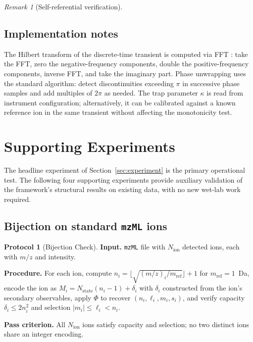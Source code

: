 \documentclass[twocolumn,10pt,a4paper]{article}
\theoremstyle{thmstyle}
\theoremstyle{definition}
\newtheorem{protocol}[theorem]{Protocol}
\theoremstyle{remark}
\newtheorem{remark}[theorem]{Remark}
\newcommand{\PhiMap}{\varPhi}
\begin{document}
\begin{remark}[Self-referential verification]
\subsection{Implementation notes}

The Hilbert transform of the discrete-time transient is computed via
FFT \citep{cooley1965}: take the FFT, zero the negative-frequency
components, double the positive-frequency components, inverse FFT,
and take the imaginary part. Phase unwrapping uses the standard
algorithm: detect discontinuities exceeding $\pi$ in successive phase
samples and add multiples of $2\pi$ as needed. The trap parameter
$\kappa$ is read from instrument configuration; alternatively, it can
be calibrated against a known reference ion in the same transient
without affecting the monotonicity test.

\section{Supporting Experiments}
\label{sec:supporting}

The headline experiment of Section~\ref{sec:experiment} is the
primary operational test. The following four supporting experiments
provide auxiliary validation of the framework's structural results on
existing data, with no new wet-lab work required.

\subsection{Bijection on standard \texttt{mzML} ions}

\begin{protocol}[Bijection Check]
\label{prot:bij}
\textbf{Input.} \texttt{mzML} file with $N_{\mathrm{ion}}$ detected
ions, each with $m/z$ and intensity.

\textbf{Procedure.} For each ion, compute
$n_{i}=\lfloor\sqrt{(m/z)_{i}/m_{\mathrm{ref}}}\rfloor+1$ for
$m_{\mathrm{ref}}=1$~Da, encode the ion as
$M_{i}=N_{\mathrm{state}}(n_{i}-1)+\delta_{i}$ with $\delta_{i}$
constructed from the ion's secondary observables, apply $\PhiMap$ to
recover $(n_{i},\ell_{i},m_{i},s_{i})$, and verify capacity
$\delta_{i}\leq 2n_{i}^{2}$ and selection $|m_{i}|\leq\ell_{i}<n_{i}$.

\textbf{Pass criterion.} All $N_{\mathrm{ion}}$ ions satisfy capacity
and selection; no two distinct ions share an integer encoding.


\end{protocol}
\end{remark}
\end{document}
